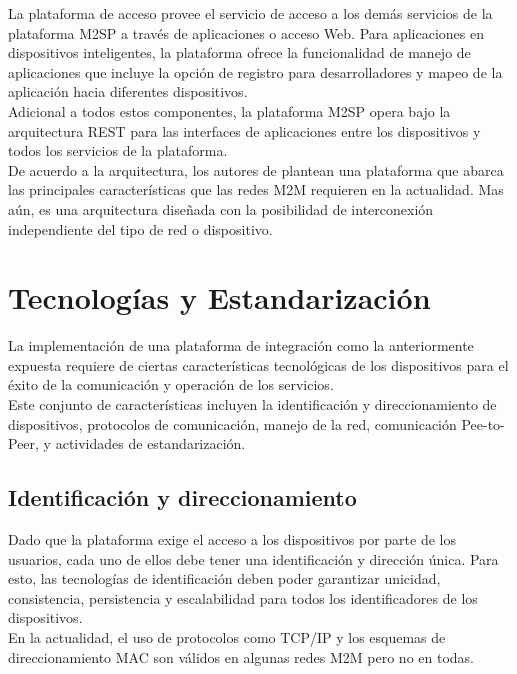 \documentclass[journal]{IEEEtran}
\begin{document}
La plataforma de acceso provee el servicio de acceso a los demás servicios de la plataforma M2SP a través de aplicaciones o acceso Web. Para aplicaciones en dispositivos inteligentes, la plataforma ofrece la funcionalidad de manejo de aplicaciones que incluye la opción de registro para desarrolladores y mapeo de la aplicación hacia diferentes dispositivos.\\

Adicional a todos estos componentes, la plataforma M2SP opera bajo la arquitectura REST para las interfaces de aplicaciones entre los dispositivos y todos los servicios de la plataforma.\\

De acuerdo a la arquitectura, los autores de \cite{paper1} plantean una plataforma que abarca las principales características que las redes M2M requieren en la actualidad. Mas aún, es una arquitectura diseñada con la posibilidad de interconexión independiente del tipo de red o dispositivo.

\section{Tecnologías y Estandarización}

La implementación de una plataforma de integración como la anteriormente expuesta requiere de ciertas características tecnológicas de los dispositivos para el éxito de la comunicación y operación de los servicios.\\

Este conjunto de características incluyen la identificación y direccionamiento de dispositivos, protocolos de comunicación, manejo de la red, comunicación Pee-to-Peer, y actividades de estandarización.

\subsection{Identificación y direccionamiento}

Dado que la plataforma exige el acceso a los dispositivos por parte de los usuarios, cada uno de ellos debe tener una identificación y dirección única. Para esto, las tecnologías de identificación deben poder garantizar unicidad, consistencia, persistencia y escalabilidad para todos los identificadores de los dispositivos.\\

En la actualidad, el uso de protocolos como TCP/IP y los esquemas de direccionamiento MAC son válidos en algunas redes M2M pero no en todas. 
\end{document}
